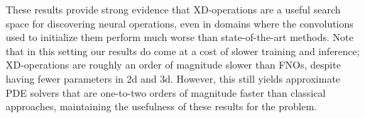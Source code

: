 These results provide strong evidence that XD-operations are a useful search space for discovering neural operations, even in domains where the convolutions used to initialize them perform much worse than state-of-the-art methods.
Note that in this setting our results do come at a cost of slower training and inference;
XD-operations are roughly an order of magnitude slower than FNOs, despite having fewer parameters in 2d and 3d.
However, this still yields approximate PDE solvers that are one-to-two orders of magnitude faster than classical approaches, maintaining the usefulness of these results for the problem.